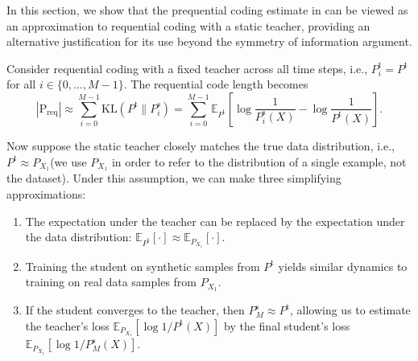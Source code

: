 \documentclass[twoside]{article}
\newcommand{\E}{\mathbb{E}}
\begin{document}
In this section, we show that the prequential coding estimate in  can be viewed as an approximation to requential coding with a static teacher, providing an alternative justification for its use beyond the symmetry of information argument.

Consider requential coding with a fixed teacher across all time steps, i.e., $P^{\mathrm{t}}_i = P^{\mathrm{t}}$ for all $i \in \{0, \ldots, M-1\}$. The requential code length becomes
\begin{equation}
    |\mathrm{P}_{\mathrm{req}}| \approx \sum_{i=0}^{M-1} \mathrm{KL}(P^{\mathrm{t}} \| P^{\mathrm{s}}_i) = \sum_{i=0}^{M-1} \E_{P^{\mathrm{t}}}\left[\log \frac{1}{P^{\mathrm{s}}_i(X)} - \log \frac{1}{P^{\mathrm{t}}(X)}\right].
\end{equation}

Now suppose the static teacher closely matches the true data distribution, i.e., $P^{\mathrm{t}} \approx P_{X_1}$(we use $P_{X_1}$ in order to refer to the distribution of a single example, not the dataset). Under this assumption, we can make three simplifying approximations:
\begin{enumerate}
    \item The expectation under the teacher can be replaced by the expectation under the data distribution: $\E_{P^{\mathrm{t}}}[\cdot] \approx \E_{P_{X_1}}[\cdot]$.
    \item Training the student on synthetic samples from $P^{\mathrm{t}}$ yields similar dynamics to training on real data samples from $P_{X_1}$.
    \item If the student converges to the teacher, then $P^{\mathrm{s}}_M \approx P^{\mathrm{t}}$, allowing us to estimate the teacher's loss $\E_{P_{X_1}}[\log 1/P^{\mathrm{t}}(X)]$ by the final student's loss $\E_{P_{X_1}}[\log 1/P^{\mathrm{s}}_M(X)]$.
\end{enumerate}
\end{document}
